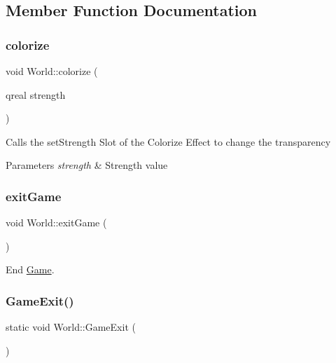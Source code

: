 \subsection{Member Function Documentation}
\mbox{\label{class_world_a3d52455b0d131b4ffa1ba208b248ade3}} 
\subsubsection{\texorpdfstring{colorize}{colorize}}
{\footnotesize\ttfamily void World\+::colorize (\begin{DoxyParamCaption}\item[{qreal}]{strength }\end{DoxyParamCaption})\hspace{0.3cm}{\ttfamily [signal]}}

Calls the set\+Strength Slot of the Colorize Effect to change the transparency 
\begin{DoxyParams}{Parameters}
{\em strength} & Strength value \\
\hline
\end{DoxyParams}
\mbox{\label{class_world_af9f6c83d12bb7d513eddba723f69f562}} 
\subsubsection{\texorpdfstring{exitGame}{exitGame}}
{\footnotesize\ttfamily void World\+::exit\+Game (\begin{DoxyParamCaption}{ }\end{DoxyParamCaption})\hspace{0.3cm}{\ttfamily [slot]}}



End \mbox{\hyperlink{class_game}{Game}}. 

\mbox{\label{class_world_a112fa179ec08117eaeb58f5a81650559}} 
\subsubsection{\texorpdfstring{GameExit()}{GameExit()}}
{\footnotesize\ttfamily static void World\+::\+Game\+Exit (\begin{DoxyParamCaption}{ }\end{DoxyParamCaption})\hspace{0.3cm}{\ttfamily [static]}}



